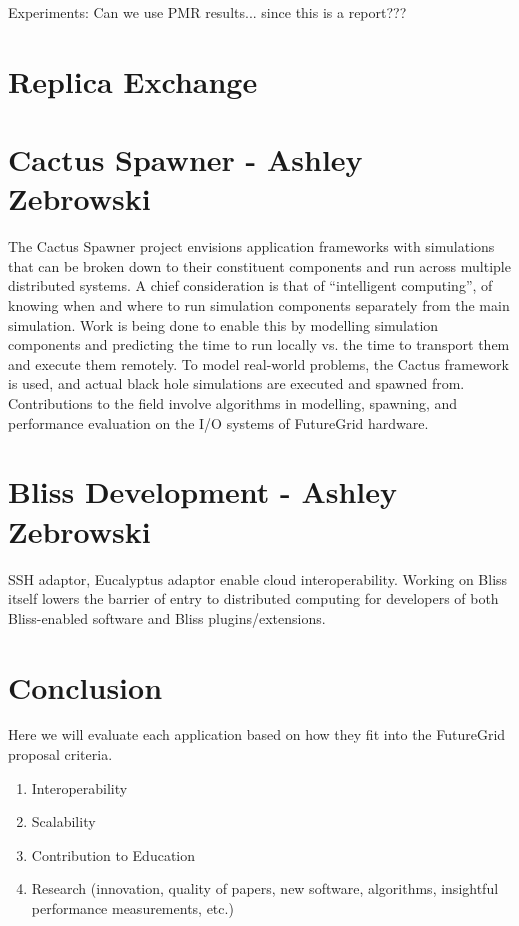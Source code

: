 \documentclass[]{paper}
\begin{document}
Experiments:
  Can we use PMR results... since this is a report???



\section{Replica Exchange}

\section{Cactus Spawner - Ashley Zebrowski}
The Cactus Spawner project envisions application frameworks with simulations that
can be broken down to their constituent components and run across multiple
distributed systems.  A chief consideration is that of ``intelligent computing'',
of knowing when and where to run simulation components separately from the main
simulation.  Work is being done to enable this by modelling simulation components
and predicting the time to run locally vs. the time to transport them and execute
them remotely.  To model real-world problems, the Cactus framework is used, and
actual black hole simulations are executed and spawned from.  Contributions
to the field involve algorithms in modelling, spawning, and performance evaluation on
the I/O systems of FutureGrid hardware.

\section{Bliss Development - Ashley Zebrowski}
SSH adaptor, Eucalyptus adaptor enable cloud interoperability.  Working on 
Bliss itself lowers the barrier of entry to distributed computing for developers
of both Bliss-enabled software and Bliss plugins/extensions.

\section{Conclusion}
Here we will evaluate each application based on how they fit into the FutureGrid proposal
criteria.
\begin{enumerate}
\item Interoperability
\item Scalability
\item Contribution to Education
\item Research (innovation, quality of papers, new software, algorithms, insightful performance measurements, etc.)

\end{enumerate}
\begin{thebibliography}{9}
\end{thebibliography}
\end{document}
